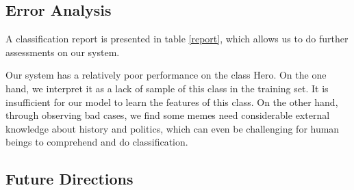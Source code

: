\documentclass[11pt]{article}
\begin{document}
\subsection{Error Analysis}
A classification report is presented in table \ref{report}, which allows us to do further assessments on our system.

\begin{table}[h]
\centering
{}
\caption{\label{report} An classification report for our final submission}
\end{table}


Our system has a relatively poor performance on the class Hero. On the one hand, we interpret it as a lack of sample of this class in the training set. It is insufficient for our model to learn the features of this class. On the other hand, through observing bad cases, we find some memes need considerable external knowledge about history and politics, which can even be challenging for human beings to comprehend and do classification.


\subsection{Future Directions}
\end{document}
